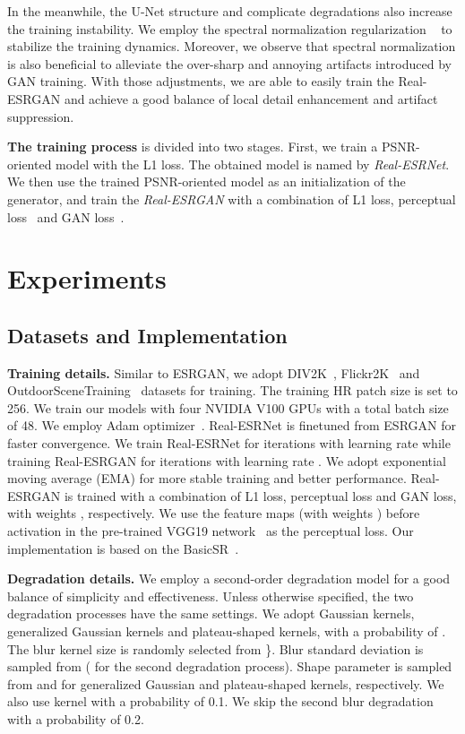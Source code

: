 \documentclass[10pt,twocolumn,letterpaper]{article}
\begin{document}
In the meanwhile, the U-Net structure and complicate degradations also increase the training instability. We employ the spectral normalization regularization ~\cite{miyato2018spectral} to stabilize the training dynamics. Moreover, we observe that spectral normalization is also beneficial to alleviate the over-sharp and annoying artifacts introduced by GAN training.
With those adjustments, we are able to easily train the Real-ESRGAN and achieve a good balance of local detail enhancement and artifact suppression.

\noindent\textbf{The training process} is divided into two stages. First, we train a PSNR-oriented model with the L1 loss.
The obtained model is named by \textit{Real-ESRNet}.
We then use the trained PSNR-oriented model as an initialization of the generator, and train the \textit{Real-ESRGAN} with a combination of  L1 loss, perceptual loss~\cite{johnson2016perceptual} and GAN loss~\cite{goodfellow2014generative,ledig2017srgan,blau2018perception}.




 \section{Experiments} \label{sec:experiments}

\subsection{Datasets and Implementation}
\label{sec:implementation}
\noindent\textbf{Training details.}
Similar to ESRGAN, we adopt DIV2K~\cite{agustsson2017ntire}, Flickr2K~\cite{timofte2017ntire} and OutdoorSceneTraining~\cite{wang2018sftgan} datasets for training.
The training HR patch size is set to 256. We train our models with four NVIDIA V100 GPUs with a total batch size of 48.
We employ Adam optimizer~\cite{kingma2014adam}. Real-ESRNet is finetuned from ESRGAN for faster convergence. We train Real-ESRNet for  iterations with learning rate  while training Real-ESRGAN for  iterations with learning rate .
We adopt exponential moving average (EMA) for more stable training and better performance.
Real-ESRGAN is trained with a combination of L1 loss, perceptual loss and GAN loss, with weights , respectively.
We use the   feature maps (with weights ) before activation in the pre-trained VGG19 network~\cite{johnson2016perceptual} as the perceptual loss. Our implementation is based on the BasicSR~\cite{wang2020basicsr}.

\noindent\textbf{Degradation details.}
We employ a second-order degradation model for a good balance of simplicity and effectiveness.
Unless otherwise specified, the two degradation processes have the same settings.
 We adopt Gaussian kernels, generalized Gaussian kernels and plateau-shaped kernels, with a probability of . The blur kernel size is randomly selected from \}. Blur standard deviation  is sampled from  ( for the second degradation process). Shape parameter  is sampled from  and  for generalized Gaussian and plateau-shaped kernels, respectively. We also use  kernel with a probability of 0.1. We skip the second blur degradation with a probability of 0.2.
\end{document}
